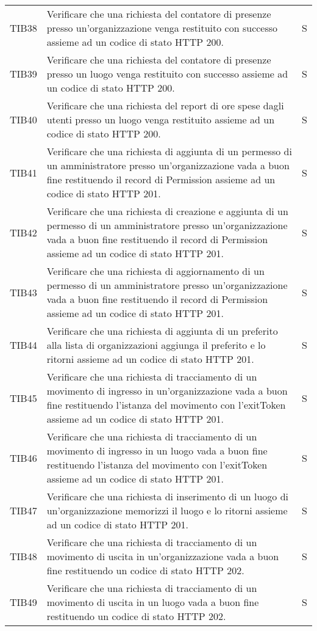 {\begin{longtable}{ c C{13cm} C{1cm}}
TIB38 & Verificare che una richiesta del contatore di presenze presso un'organizzazione venga restituito con successo assieme ad un codice di stato HTTP 200. & S \\
TIB39 & Verificare che una richiesta del contatore di presenze presso un luogo venga restituito con successo assieme ad un codice di stato HTTP 200. & S \\
TIB40 & Verificare che una richiesta del report di ore spese dagli utenti presso un luogo venga restituito assieme ad un codice di stato HTTP 200. & S \\
TIB41 & Verificare che una richiesta di aggiunta di un permesso di un amministratore presso un'organizzazione vada a buon fine restituendo il record di Permission assieme ad un codice di stato HTTP 201. & S \\
TIB42 & Verificare che una richiesta di creazione e aggiunta di un permesso di un amministratore presso un'organizzazione vada a buon fine restituendo il record di Permission assieme ad un codice di stato HTTP 201. & S \\
TIB43 & Verificare che una richiesta di aggiornamento di un permesso di un amministratore presso un'organizzazione vada a buon fine restituendo il record di Permission assieme ad un codice di stato HTTP 201. & S \\
TIB44 & Verificare che una richiesta di aggiunta di un preferito alla lista di organizzazioni aggiunga il preferito e lo ritorni assieme ad un codice di stato HTTP 201. & S \\
TIB45 & Verificare che una richiesta di tracciamento di un movimento di ingresso in un'organizzazione vada a buon fine restituendo l'istanza del movimento con l'exitToken assieme ad un codice di stato HTTP 201. & S \\
TIB46 & Verificare che una richiesta di tracciamento di un movimento di ingresso in un luogo vada a buon fine restituendo l'istanza del movimento con l'exitToken assieme ad un codice di stato HTTP 201. & S \\
TIB47 & Verificare che una richiesta di inserimento di un luogo di un'organizzazione memorizzi il luogo e lo ritorni assieme ad un codice di stato HTTP 201. & S \\
TIB48 & Verificare che una richiesta di tracciamento di un movimento di uscita in un'organizzazione vada a buon fine restituendo un codice di stato HTTP 202. & S \\
TIB49 & Verificare che una richiesta di tracciamento di un movimento di uscita in un luogo vada a buon fine restituendo un codice di stato HTTP 202. & S \\

\end{longtable}}
